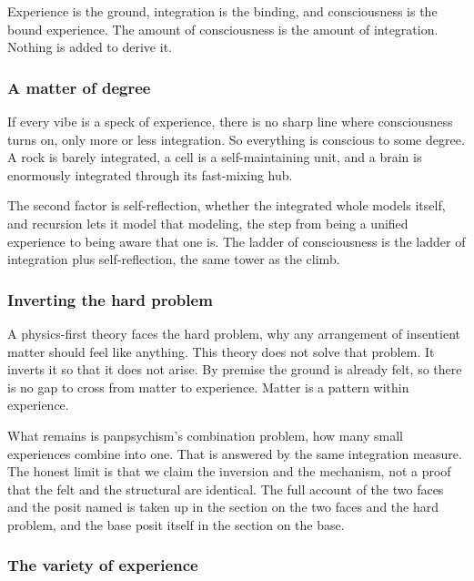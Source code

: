 \begin{principle}
Experience is the ground, integration is the binding, and consciousness is the bound experience. The amount of consciousness is the amount of integration. Nothing is added to derive it.
\end{principle}

\subsubsection{A matter of degree}

If every vibe is a speck of experience, there is no sharp line where consciousness turns on, only more or less integration. So everything is conscious to some degree. A rock is barely integrated, a cell is a self-maintaining unit, and a brain is enormously integrated through its fast-mixing hub.

The second factor is self-reflection, whether the integrated whole models itself, and recursion lets it model that modeling, the step from being a unified experience to being aware that one is. The ladder of consciousness is the ladder of integration plus self-reflection, the same tower as the climb.

\subsubsection{Inverting the hard problem}

A physics-first theory faces the hard problem, why any arrangement of insentient matter should feel like anything. This theory does not solve that problem. It inverts it so that it does not arise. By premise the ground is already felt, so there is no gap to cross from matter to experience. Matter is a pattern within experience.

What remains is panpsychism's combination problem, how many small experiences combine into one. That is answered by the same integration measure. The honest limit is that we claim the inversion and the mechanism, not a proof that the felt and the structural are identical. The full account of the two faces and the posit named is taken up in the section on the two faces and the hard problem, and the base posit itself in the section on the base.

\subsubsection{The variety of experience}


